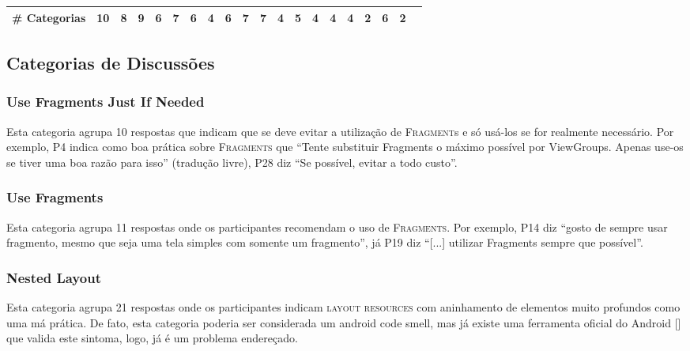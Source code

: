 \begin{table*}[t]
\begin{tabular}{p{4cm}|p{.3cm}p{.3cm}p{.3cm}p{.3cm}p{.3cm}p{.3cm}p{.3cm}p{.3cm}p{.3cm}p{.4cm}p{.4cm}p{.4cm}p{.4cm}p{.4cm}p{.4cm}p{.4cm}p{.4cm}p{.4cm}p{.4cm}}
\hline
\multicolumn{1}{c}{\textbf{\# Categorias}}	& \multicolumn{1}{c}{10} & \multicolumn{1}{c}{8} & \multicolumn{1}{c}{9} & \multicolumn{1}{c}{6} & \multicolumn{1}{c}{7} & \multicolumn{1}{c}{6} & \multicolumn{1}{c}{4} & \multicolumn{1}{c}{6} & \multicolumn{1}{c}{7} & \multicolumn{1}{c}{7} & \multicolumn{1}{c}{4} & \multicolumn{1}{c}{5} & \multicolumn{1}{c}{4} & \multicolumn{1}{c}{4} & \multicolumn{1}{c}{4} & \multicolumn{1}{c}{2} & \multicolumn{1}{c}{6} & \multicolumn{1}{c}{2} \\
\toprule
\end{tabular}
\label{tab:Categories}
\end{table*}


\subsection{Categorias de Discuss\~oes}

\subsubsection{Use Fragments Just If Needed} 
Esta categoria agrupa 10 respostas que indicam que se deve evitar a utilização de \textsc{Fragment}s e s\'o usá-los se for realmente necessário. Por exemplo, P4 indica como boa pr\'atica sobre \textsc{Fragments} que ``Tente substituir Fragments o m\'aximo poss\'ivel por ViewGroups. Apenas use-os se tiver uma boa raz\~ao para isso'' (tradu\c{c}\~ao livre), P28 diz ``Se poss\'ivel, evitar a todo custo''. 

\subsubsection{Use Fragments} 
Esta categoria agrupa 11 respostas onde os participantes recomendam o uso de \textsc{Fragments}. Por exemplo, P14 diz ``gosto de sempre usar fragmento, mesmo que seja uma tela simples com somente um fragmento'', j\'a P19 diz ``[...] utilizar Fragments sempre que poss\'ivel''. 

\subsubsection{Nested Layout} 
Esta categoria agrupa 21 respostas onde os participantes indicam \textsc{layout resources} com aninhamento de elementos muito profundos como uma má prática. De fato, esta categoria poderia ser considerada um android code smell, mas já existe uma ferramenta oficial do Android [] que valida este sintoma, logo, já é um problema endereçado.

